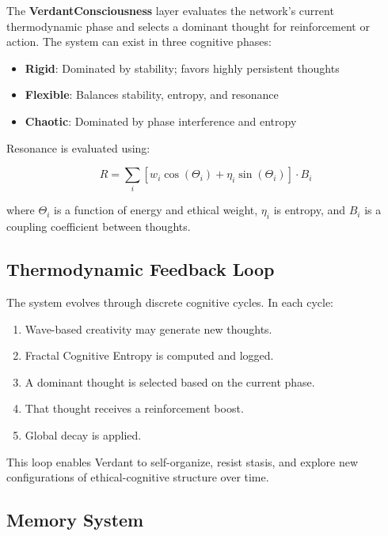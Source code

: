\documentclass{article}
\begin{document}
The \textbf{VerdantConsciousness} layer evaluates the network’s current thermodynamic phase and selects a dominant thought for reinforcement or action. The system can exist in three cognitive phases:

\begin{itemize}
    \item \textbf{Rigid}: Dominated by stability; favors highly persistent thoughts
    \item \textbf{Flexible}: Balances stability, entropy, and resonance
    \item \textbf{Chaotic}: Dominated by phase interference and entropy
\end{itemize}

Resonance is evaluated using:

\begin{equation}
R = \sum_i \left[ w_i \cos(\Theta_i) + \eta_i \sin(\Theta_i) \right] \cdot B_i
\end{equation}

\noindent where $\Theta_i$ is a function of energy and ethical weight, $\eta_i$ is entropy, and $B_i$ is a coupling coefficient between thoughts.

\subsection{Thermodynamic Feedback Loop}

The system evolves through discrete cognitive cycles. In each cycle:

\begin{enumerate}
    \item Wave-based creativity may generate new thoughts.
    \item Fractal Cognitive Entropy is computed and logged.
    \item A dominant thought is selected based on the current phase.
    \item That thought receives a reinforcement boost.
    \item Global decay is applied.
\end{enumerate}

This loop enables Verdant to self-organize, resist stasis, and explore new configurations of ethical-cognitive structure over time.

\subsection{Memory System}
\end{document}
